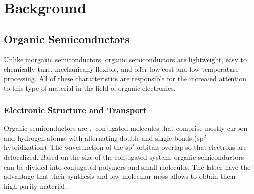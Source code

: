 \chapter{Background} \label{chap:background}

\section{Organic Semiconductors}

Unlike inorganic semiconductors, organic semiconductors are lightweight, easy to chemically tune, mechanically flexible, and offer low-cost and low-temperature processing. All of these characteristics are responsible for the increased attention to this type of material in the field of organic electronics. 


\subsection{Electronic Structure and Transport} 

Organic semiconductors are $\pi$-conjugated molecules that comprise mostly carbon and hydrogen atoms, with alternating double and single bonds (sp$^{2}$ hybridization). The wavefunction of the sp$^{2}$ orbitals overlap so that electrons are delocalized.
Based on the size of the conjugated system, organic semiconductors can be divided into conjugated polymers and small molecules. The latter have the advantage that their synthesis and low molecular mass allows to obtain them high purity material \cite{alcacerElectronicStructureOrganic2018}.

